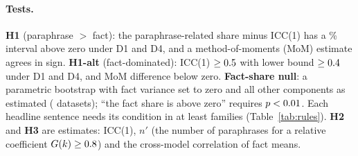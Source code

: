 \documentclass[11pt]{article}
\newcommand{\ICCone}{ICC(1)\xspace} %
\newcommand{\nprime}{\ensuremath{n'}\xspace}
\begin{document}
\paragraph{Tests.}
\textbf{H1} (paraphrase $>$ fact): the paraphrase-related share minus \ICCone{} has a \ptCiLevel\% interval above zero under D1 and D4, and a method-of-moments (MoM) estimate agrees in sign.
\textbf{H1-alt} (fact-dominated): \ICCone{} $\ge 0.5$ with lower bound $\ge 0.4$ under D1 and D4, and MoM difference below zero.
\textbf{Fact-share null}: a parametric bootstrap with fact variance set to zero and all other components as estimated (\ptRuleNBootNull{} datasets); ``the fact share is above zero'' requires $p<0.01$.
Each headline sentence needs its condition in at least \ptRuleMinFamilies{} families (Table~\ref{tab:rules}).
\textbf{H2} and \textbf{H3} are estimates: \ICCone, \nprime{} (the number of paraphrases for a relative coefficient $G(k) \ge 0.8$) and the cross-model correlation of fact means.
\end{document}

